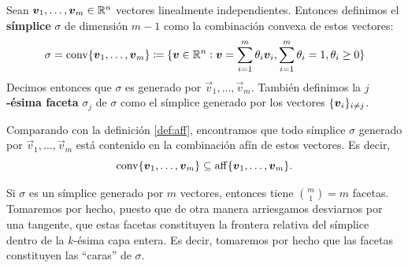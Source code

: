 \begin{definition}
	\label{def:simplex}
	Sean $\boldsymbol{v}_1, \ldots, \boldsymbol{v}_m \in \mathbb{R}^n$ vectores linealmente
	independientes. Entonces definimos el \textbf{símplice} $\sigma$ de
	dimensión $m - 1$ como la combinación convexa de estos vectores:
	\begin{equation*}
		\sigma = \operatorname{conv}\lbrace \boldsymbol{v}_1, \ldots, \boldsymbol{v}_m \rbrace
		\coloneq
		\lbrace 
			\boldsymbol{v} \in \mathbb{R}^n \vcentcolon \boldsymbol{v} = \sum_{i=1}^{m}\theta_i\boldsymbol{v}_i,
			\sum_{i=1}^{m}\theta_i=1, \theta_i \geq 0
		 \rbrace
	\end{equation*}
	Decimos entonces que $\sigma$ es generado por $\vec{v}_1, \ldots, \vec{v}_m$. También definimos
	la \textbf{$j$-ésima faceta} $\sigma_j$ de $\sigma$ como el símplice generado por los vectores
	$\lbrace \boldsymbol{v}_i \rbrace_{i \neq j}$.
\end{definition}
\begin{observation}
	Comparando con la definición \ref{def:aff}, encontramos que todo símplice $\sigma$ generado por
	$\vec{v}_1, \ldots, \vec{v}_m$ está contenido en la combinación afín de estos vectores. Es
	decir,
	\begin{equation}
		\label{aff:contention}
		\operatorname{conv}\lbrace \boldsymbol{v}_1, \ldots, \boldsymbol{v}_m \rbrace \subseteq
		\operatorname{aff}\lbrace \boldsymbol{v}_1, \ldots, \boldsymbol{v}_m \rbrace.
	\end{equation}
\end{observation}
\begin{observation}
	Si $\sigma$ es un símplice generado por $m$ vectores, entonces tiene
	$\binom{m}{1} = m$ facetas. Tomaremos por hecho, puesto que de otra
	manera arriesgamos desviarnos por una tangente, que estas facetas
	constituyen la frontera relativa del símplice dentro de la $k$-ésima capa
	entera. Es decir, tomaremos por hecho que las facetas constituyen las
	``caras'' de $\sigma$.
\end{observation}

